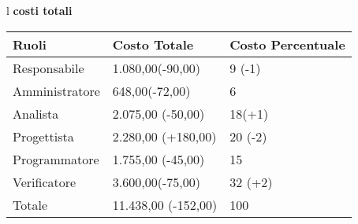 \begin{tabular}{l}
\Large{\textbf{\textsf{costi totali}}} \\
\begin{tabular}{||p{4cm}||p{4cm}||p{4cm}||}
\hline
\textbf{Ruoli} & \textbf{Costo Totale}& \textbf{Costo Percentuale}\\
\hline
{Responsabile}&1.080,00\footnotesize{(-90,00)}&9 \footnotesize{(-1)}\\ 
\hline 
{Amministratore} &648,00\footnotesize{(-72,00)}&6\\ 
\hline
{Analista} &2.075,00 \footnotesize{(-50,00)}&18\footnotesize{(+1)} \\
\hline
{Progettista} &2.280,00 \footnotesize{(+180,00)}&20 \footnotesize{(-2)} \\
\hline
{Programmatore} &1.755,00 \footnotesize{(-45,00)}&15\\
\hline
{Verificatore} &3.600,00\footnotesize{(-75,00)}&32 \footnotesize{(+2)} \\
\hline
{Totale} &11.438,00 \footnotesize{(-152,00)}&100 \\
\hline

\end{tabular} \\
\end{tabular}



